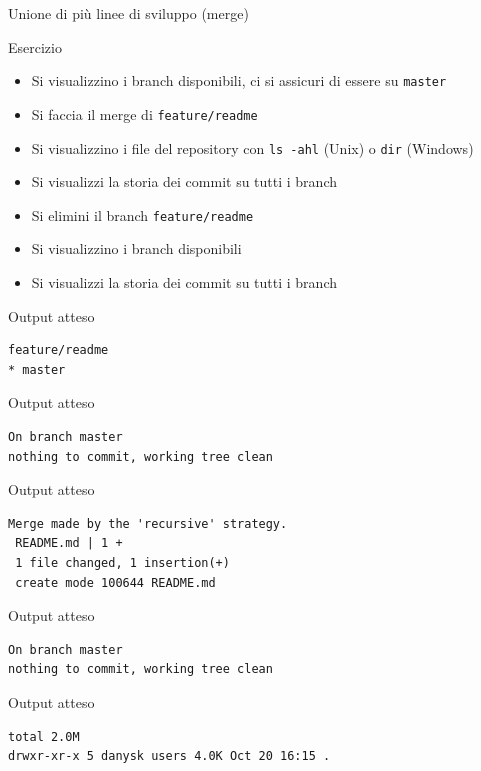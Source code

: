 \documentclass[xcolor=dvipsnames,presentation]{beamer}
\begin{document}
\begin{frame}{Unione di più linee di sviluppo (merge)}
\begin{block}{Esercizio}
        \begin{itemize}
            \footnotesize
            \item Si visualizzino i branch disponibili, ci si assicuri di essere su \texttt{master}
            \item Si faccia il merge di \texttt{feature/readme}
            \item Si visualizzino i file del repository con \texttt{ls -ahl} (Unix) o \texttt{dir} (Windows)
            \item Si visualizzi la storia dei commit su tutti i branch
            \item Si elimini il branch \texttt{feature/readme}
            \item Si visualizzino i branch disponibili
            \item Si visualizzi la storia dei commit su tutti i branch
        \end{itemize}
    \end{block}
    \begin{block}{Output atteso}
        \begin{Verbatim}[fontsize=\scriptsize]
  feature/readme
* master
        \end{Verbatim}
    \end{block}
    \begin{block}{Output atteso}
        \begin{Verbatim}[fontsize=\scriptsize]
On branch master
nothing to commit, working tree clean
        \end{Verbatim}
    \end{block}
    \begin{block}{Output atteso}
        \begin{Verbatim}[fontsize=\scriptsize]
Merge made by the 'recursive' strategy.
 README.md | 1 +
 1 file changed, 1 insertion(+)
 create mode 100644 README.md
        \end{Verbatim}
    \end{block}
    \begin{block}{Output atteso}
        \begin{Verbatim}[fontsize=\scriptsize]
On branch master
nothing to commit, working tree clean
        \end{Verbatim}
    \end{block}
    \begin{block}{Output atteso}
        \begin{Verbatim}[fontsize=\scriptsize]
total 2.0M
drwxr-xr-x 5 danysk users 4.0K Oct 20 16:15 .

\end{Verbatim}
\end{block}
\end{frame}
\end{document}

